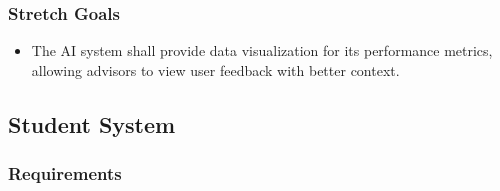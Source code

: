 \documentclass[titlepage, 12pt]{article}
\begin{document}
\subsubsection{Stretch Goals}

\begin{itemize}
    \item The AI system shall provide data visualization for its performance metrics, allowing advisors to view user feedback with better context.
\end{itemize}

\subsection{Student System}

\subsubsection{Requirements}
\end{document}

